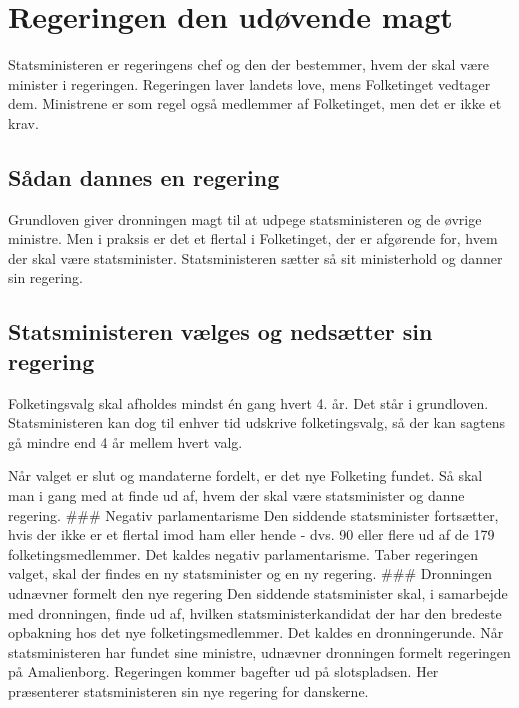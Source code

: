 \documentclass[]{book}
\begin{document}
\hypertarget{regeringen-den-udvende-magt}{%
\section{Regeringen den udøvende magt}\label{regeringen-den-udvende-magt}}

Statsministeren er regeringens chef og den der bestemmer, hvem der skal være minister i regeringen. Regeringen laver landets love, mens Folketinget vedtager dem. Ministrene er som regel også medlemmer af Folketinget, men det er ikke et krav.

\hypertarget{sadan-dannes-en-regering}{%
\subsection{Sådan dannes en regering}\label{sadan-dannes-en-regering}}

Grundloven giver dronningen magt til at udpege statsministeren og de øvrige ministre. Men i praksis er det et flertal i Folketinget, der er afgørende for, hvem der skal være statsminister. Statsministeren sætter så sit ministerhold og danner sin regering.

\hypertarget{statsministeren-vlges-og-nedstter-sin-regering}{%
\subsection{Statsministeren vælges og nedsætter sin regering}\label{statsministeren-vlges-og-nedstter-sin-regering}}

Folketingsvalg skal afholdes mindst én gang hvert 4. år. Det står i grundloven. Statsministeren kan dog til enhver tid udskrive folketingsvalg, så der kan sagtens gå mindre end 4 år mellem hvert valg.

Når valget er slut og mandaterne fordelt, er det nye Folketing fundet. Så skal man i gang med at finde ud af, hvem der skal være statsminister og danne regering.
\#\#\# Negativ parlamentarisme
Den siddende statsminister fortsætter, hvis der ikke er et flertal imod ham eller hende - dvs. 90 eller flere ud af de 179 folketingsmedlemmer. Det kaldes negativ parlamentarisme.
Taber regeringen valget, skal der findes en ny statsminister og en ny regering.
\#\#\# Dronningen udnævner formelt den nye regering
Den siddende statsminister skal, i samarbejde med dronningen, finde ud af, hvilken statsministerkandidat der har den bredeste opbakning hos det nye folketingsmedlemmer. Det kaldes en dronningerunde.
Når statsministeren har fundet sine ministre, udnævner dronningen formelt regeringen på Amalienborg. Regeringen kommer bagefter ud på slotspladsen. Her præsenterer statsministeren sin nye regering for danskerne.
\end{document}
